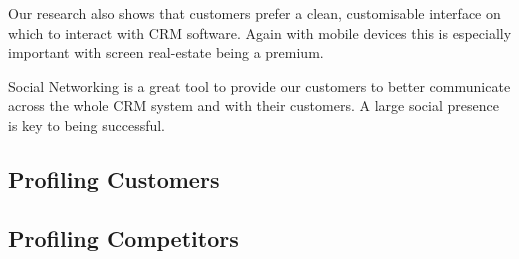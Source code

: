 \documentclass[DIV=calc, paper=a4, fontsize=11pt]{scrartcl}	 %
\begin{document}
Our research also shows that customers prefer a clean, customisable interface on which to interact
with CRM software. Again with mobile devices this is especially important with screen real-estate
being a premium.

Social Networking is a great tool to provide our customers to better communicate across the whole
CRM system and with their customers. A large social presence is key to being successful.

\subsection{Profiling Customers}

\subsection{Profiling Competitors}
\end{document}
